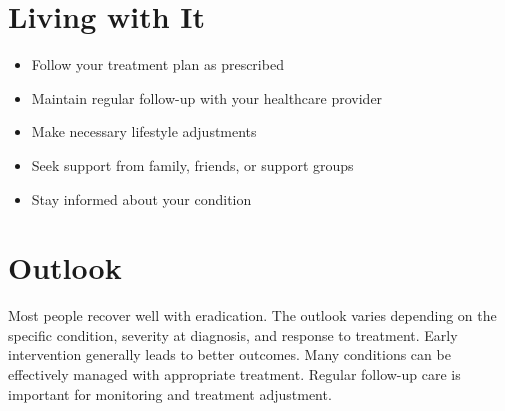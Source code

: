\section{Living with It}
\begin{itemize}[noitemsep]
  \item Follow your treatment plan as prescribed
  \item Maintain regular follow-up with your healthcare provider
  \item Make necessary lifestyle adjustments
  \item Seek support from family, friends, or support groups
  \item Stay informed about your condition
\end{itemize}
\section{Outlook}
Most people recover well with eradication. The outlook varies depending on the specific condition, severity at diagnosis, and response to treatment. Early intervention generally leads to better outcomes. Many conditions can be effectively managed with appropriate treatment. Regular follow-up care is important for monitoring and treatment adjustment.
